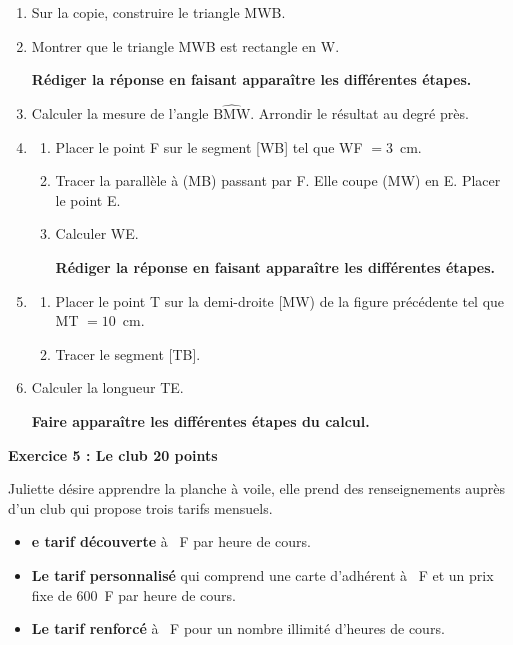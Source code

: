 \documentclass[11pt]{article}
\begin{document}
\begin{enumerate}
\item Sur la copie, construire le triangle MWB.
\item Montrer que le triangle MWB est rectangle en W.

\textbf{Rédiger la réponse en faisant apparaître les différentes étapes.}
\item Calculer la mesure de l'angle $\widehat{\text{BMW}}$. Arrondir le résultat au degré près.
\item
	\begin{enumerate}
		\item Placer le point F sur le segment [WB] tel que WF $= 3$~cm.
		\item Tracer la parallèle à (MB) passant par F. Elle coupe (MW) en E. Placer le point E. 
		\item Calculer WE.

\textbf{Rédiger la réponse en faisant apparaître les différentes étapes.}
	\end{enumerate}
\item 
	\begin{enumerate}
		\item Placer le point T sur la demi-droite [MW) de la figure précédente tel que MT $= 10$~cm.
		\item Tracer le segment [TB].
	\end{enumerate}
\item Calculer la longueur TE.

\textbf{Faire apparaître les différentes étapes du calcul.}
\end{enumerate}

\bigskip

\textbf{Exercice 5 : Le club \hfill 20 points}

\medskip

Juliette désire apprendre la planche à voile, elle prend des renseignements auprès d'un club qui propose trois tarifs mensuels.

\begin{itemize}
\item[$\bullet~~$] \textbf{e tarif découverte} à ~F par heure de cours.
\item[$\bullet~~$] \textbf{Le tarif personnalisé} qui comprend une carte d'adhérent à ~F et un prix fixe de $600$~F par heure de cours.
\item[$\bullet~~$] \textbf{Le tarif renforcé} à ~F pour un nombre illimité d'heures de cours.
\end{itemize}
\end{document}
